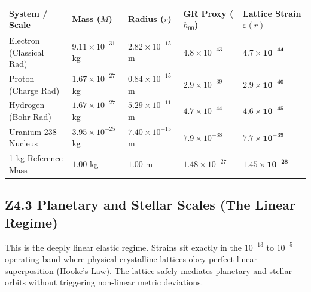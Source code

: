 \documentclass[11pt, letterpaper, openany]{book}
\begin{document}
\begin{center}
\renewcommand{\arraystretch}{1.2}
\small
\begin{tabular}{|p{3.5cm}|p{2cm}|p{2.5cm}|p{2.2cm}|p{2.5cm}|}
\hline
\rowcolor{kishblue!12}
\textbf{System / Scale} & \textbf{Mass ($M$)} & \textbf{Radius ($r$)} & \textbf{GR Proxy ($h_{00}$)} & \textbf{Lattice Strain $\varepsilon(r)$} \\
\hline
Electron (Classical Rad) & $9.11 \times 10^{-31}$ kg & $2.82 \times 10^{-15}$ m & $4.8 \times 10^{-43}$ & $\mathbf{4.7 \times 10^{-44}}$ \\
\hline
Proton (Charge Rad) & $1.67 \times 10^{-27}$ kg & $0.84 \times 10^{-15}$ m & $2.9 \times 10^{-39}$ & $\mathbf{2.9 \times 10^{-40}}$ \\
\hline
Hydrogen (Bohr Rad) & $1.67 \times 10^{-27}$ kg & $5.29 \times 10^{-11}$ m & $4.7 \times 10^{-44}$ & $\mathbf{4.6 \times 10^{-45}}$ \\
\hline
Uranium-238 Nucleus & $3.95 \times 10^{-25}$ kg & $7.40 \times 10^{-15}$ m & $7.9 \times 10^{-38}$ & $\mathbf{7.7 \times 10^{-39}}$ \\
\hline
1 kg Reference Mass & $1.00$ kg & $1.00$ m & $1.48 \times 10^{-27}$ & $\mathbf{1.45 \times 10^{-28}}$ \\
\hline
\end{tabular}
\end{center}

\subsection*{Z4.3 Planetary and Stellar Scales (The Linear Regime)}

This is the deeply linear elastic regime. Strains sit exactly in the $10^{-13}$ to $10^{-5}$ operating band where physical crystalline lattices obey perfect linear superposition (Hooke's Law). The lattice safely mediates planetary and stellar orbits without triggering non-linear metric deviations.
\end{document}
